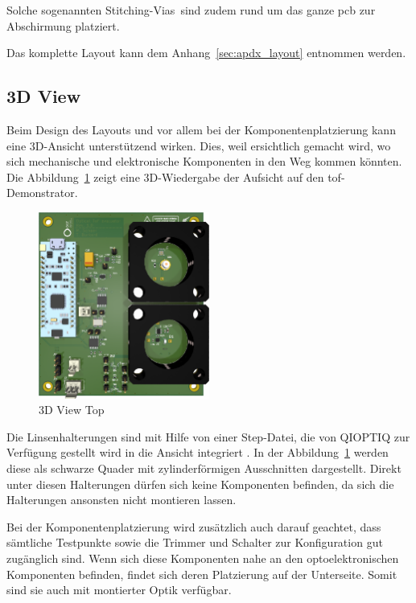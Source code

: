 Solche sogenannten \dq Stitching-Vias\dq\ sind zudem rund um das ganze \acrshort{pcb} zur Abschirmung platziert.

Das komplette Layout kann dem Anhang~\ref{sec:apdx_layout} entnommen werden.

\pagebreak

\subsection{3D View}
Beim Design des Layouts und vor allem bei der Komponentenplatzierung kann eine 3D-Ansicht unterstützend wirken. Dies, weil
ersichtlich gemacht wird, wo sich mechanische und elektronische Komponenten in den Weg kommen könnten. Die Abbildung~\ref{fig:3d_top}
zeigt eine 3D-Wiedergabe der Aufsicht auf den \acrshort{tof}-Demonstrator.

\begin{figure}[H]
    \centering
    \includegraphics[width=0.5\textwidth]{graphics/3d_top.png}
    \caption{3D View Top}\label{fig:3d_top}
\end{figure}

Die Linsenhalterungen sind mit Hilfe von einer Step-Datei, die von QIOPTIQ zur Verfügung gestellt wird in die Ansicht
integriert \cite{qioptiq2024g061041000_shoppage}. In der Abbildung~\ref{fig:3d_top} werden diese als schwarze Quader mit
zylinderförmigen Ausschnitten dargestellt. Direkt unter diesen Halterungen dürfen sich keine Komponenten befinden, da
sich die Halterungen ansonsten nicht montieren lassen.

Bei der Komponentenplatzierung wird zusätzlich auch darauf geachtet, dass sämtliche Testpunkte sowie die Trimmer und
Schalter zur Konfiguration gut zugänglich sind. Wenn sich diese Komponenten nahe an den optoelektronischen Komponenten
befinden, findet sich deren Platzierung auf der Unterseite. Somit sind sie auch mit montierter Optik verfügbar.

